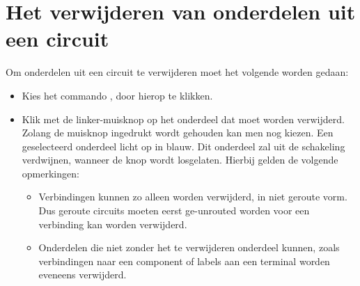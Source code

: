 \section{Het verwijderen van onderdelen uit een circuit}
Om onderdelen uit een circuit te verwijderen moet het volgende
worden gedaan:
\begin{itemize}
\item Kies het commando , door hierop te klikken.
\item Klik met de linker-muisknop op het onderdeel dat moet worden verwijderd.
      Zolang de muisknop ingedrukt wordt gehouden kan men nog kiezen.
      Een geselecteerd onderdeel licht op in blauw.
      Dit onderdeel zal uit de schakeling verdwijnen, wanneer de knop wordt losgelaten.
      Hierbij gelden de volgende opmerkingen:
      \begin{itemize}
      \item Verbindingen kunnen zo alleen worden verwijderd, in niet geroute
            vorm. Dus geroute circuits moeten eerst ge-unrouted worden voor
            een verbinding kan worden verwijderd.
      \item  Onderdelen die niet zonder het te verwijderen onderdeel kunnen,
             zoals verbindingen naar een component of labels aan een terminal
             worden eveneens verwijderd.
      \end{itemize}
\end{itemize}

